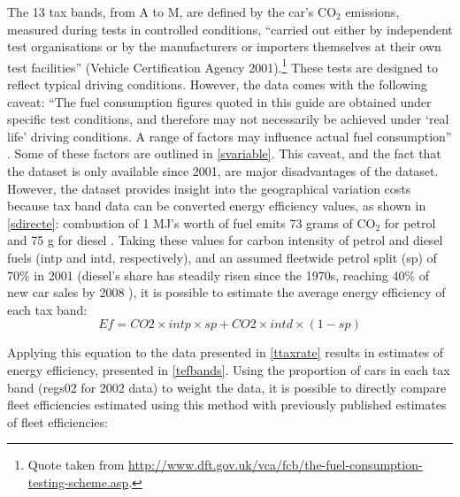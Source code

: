 The 13 tax bands, from A to M, are defined by the car's CO$_2$ emissions, measured
during tests in controlled conditions, ``carried out either by independent test
organisations or by the manufacturers or importers themselves at their own test
facilities'' (Vehicle Certification Agency 2001)⁠.\footnote{Quote taken from
\href{http://www.dft.gov.uk/vca/fcb/the-fuel-consumption-testing-scheme.asp}
{http://www.dft.gov.uk/vca/fcb/the-fuel-consumption-testing-scheme.asp}.
}
These tests are designed to reflect typical driving
conditions. However, the data comes with the following caveat: ``The fuel
consumption figures quoted in this guide are obtained under specific test
conditions, and therefore may not necessarily be achieved under `real life'
driving conditions. A range of factors may influence actual fuel consumption''
\citep{VehicleCertificationAgency2011}.
Some of these factors are outlined
in \cref{svariable}.
This caveat, and the fact that the dataset is only available since 2001, are major
disadvantages of the dataset. However, the dataset provides insight into
the geographical variation costs because tax band data can be
converted energy efficiency values, as shown in
\cref{sdirecte}: combustion of 1 MJ's worth of fuel emits
73
grams of CO$_2$ for petrol and 75 g for diesel \citep{Dimitriou2009}.
Taking these values for carbon intensity of petrol and diesel fuels
(intp and intd, respectively), and an assumed fleetwide petrol split (sp) of
70\% in 2001 (diesel's share has steadily risen since the 1970s, reaching 40\% of
new car sales by 2008 \citep{Bonilla2009}⁠), it is possible to estimate the average
energy efficiency of each tax band:
\begin{equation}
 Ef = CO2 \times intp \times sp + CO2 \times intd \times (1-sp)
 \label{ebands}
\end{equation}

Applying this equation to the data presented in \cref{ttaxrate} results in estimates of
energy efficiency, presented in \cref{tefbands}. Using the proportion of cars in each tax band
(regs02 for 2002 data) to weight the data, it is possible to directly compare
fleet efficiencies estimated using this method with previously published
estimates of fleet efficiencies:

